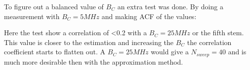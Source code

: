 To figure out a balanced value of $B_C$ an extra test was done. By doing a measurement with $B_C = 5MHz$ and making \gls{ACF} of the values:


Here the test show a correlation of <0.2 with a $B_C = 25MHz$ or the fifth stem. This value is closer to the estimation and increasing the $B_C$ the correlation coefficient starts to flatten out. A $B_C = 25MHz$ would give a  $N_{sweep} = 40$ and is much more desirable then with the approximation method.

